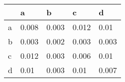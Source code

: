 \begin{tabular}{lllll}
\toprule
{} &      a &      b &      c &      d \\
\midrule
a &  0.008 &  0.003 &  0.012 &   0.01 \\
b &  0.003 &  0.002 &  0.003 &  0.003 \\
c &  0.012 &  0.003 &  0.006 &   0.01 \\
d &   0.01 &  0.003 &   0.01 &  0.007 \\
\bottomrule
\end{tabular}
